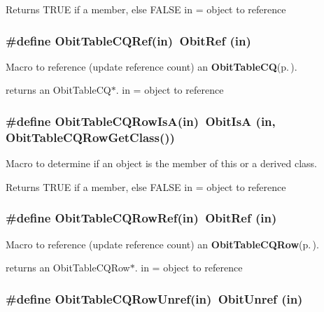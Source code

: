 Returns TRUE if a member, else FALSE in = object to reference 
\subsubsection{\setlength{\rightskip}{0pt plus 5cm}\#define Obit\-Table\-CQRef(in)\ Obit\-Ref (in)}\label{ObitTableCQ_8h_a2}


Macro to reference (update reference count) an {\bf Obit\-Table\-CQ}{\rm (p.\,\pageref{structObitTableCQ})}. 

returns an Obit\-Table\-CQ$\ast$. in = object to reference 
\subsubsection{\setlength{\rightskip}{0pt plus 5cm}\#define Obit\-Table\-CQRow\-Is\-A(in)\ Obit\-Is\-A (in, Obit\-Table\-CQRow\-Get\-Class())}\label{ObitTableCQ_8h_a6}


Macro to determine if an object is the member of this or a derived class. 

Returns TRUE if a member, else FALSE in = object to reference 
\subsubsection{\setlength{\rightskip}{0pt plus 5cm}\#define Obit\-Table\-CQRow\-Ref(in)\ Obit\-Ref (in)}\label{ObitTableCQ_8h_a5}


Macro to reference (update reference count) an {\bf Obit\-Table\-CQRow}{\rm (p.\,\pageref{structObitTableCQRow})}. 

returns an Obit\-Table\-CQRow$\ast$. in = object to reference 
\subsubsection{\setlength{\rightskip}{0pt plus 5cm}\#define Obit\-Table\-CQRow\-Unref(in)\ Obit\-Unref (in)}\label{ObitTableCQ_8h_a4}


